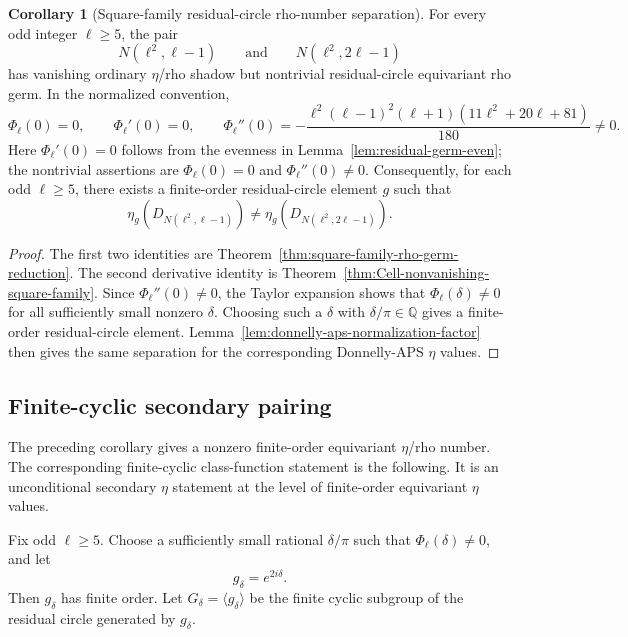 \documentclass{article}
\theoremstyle{definition}
\newtheorem{corollary}[theorem]{Corollary}
\numberwithin{equation}{section}
\begin{document}
\begin{corollary}[Square-family residual-circle rho-number separation]
\label{cor:square-family-rho-separation-final}
For every odd integer $\ell\geq 5$, the pair
\begin{equation}
N(\ell^2,\ell-1)
\qquad\text{and}\qquad
N(\ell^2,2\ell-1)
\end{equation}
has vanishing ordinary $\eta$/rho shadow but nontrivial residual-circle equivariant rho germ.  In the normalized convention,
\begin{equation}
\Phi_\ell(0)=0,
\qquad
\Phi_\ell'(0)=0,
\qquad
\Phi_\ell''(0)=-\frac{\ell^2(\ell-1)^2(\ell+1)(11\ell^2+20\ell+81)}{180}\neq 0.
\end{equation}
Here $\Phi_\ell'(0)=0$ follows from the evenness in Lemma~\ref{lem:residual-germ-even}; the nontrivial assertions are $\Phi_\ell(0)=0$ and $\Phi_\ell''(0)\neq 0$.  Consequently, for each odd $\ell\geq 5$, there exists a finite-order residual-circle element $g$ such that
\begin{equation}
\eta_g(D_{N(\ell^2,\ell-1)})\neq\eta_g(D_{N(\ell^2,2\ell-1)}).
\end{equation}
\end{corollary}

\begin{proof}
The first two identities are Theorem~\ref{thm:square-family-rho-germ-reduction}.  The second derivative identity is Theorem~\ref{thm:Cell-nonvanishing-square-family}.  Since $\Phi_\ell''(0)\neq 0$, the Taylor expansion shows that $\Phi_\ell(\delta)\neq 0$ for all sufficiently small nonzero $\delta$.  Choosing such a $\delta$ with $\delta/\pi\in\mathbb Q$ gives a finite-order residual-circle element. Lemma~\ref{lem:donnelly-aps-normalization-factor} then gives the same separation for the corresponding Donnelly-APS $\eta$ values.
\end{proof}

\subsection{Finite-cyclic secondary pairing}
\label{subsec:stage5B4-finite-cyclic-secondary-pairing}

The preceding corollary gives a nonzero finite-order equivariant $\eta$/rho number.  The corresponding finite-cyclic class-function statement is the following.  It is an unconditional secondary $\eta$ statement at the level of finite-order equivariant $\eta$ values.

Fix odd $\ell\geq 5$.  Choose a sufficiently small rational $\delta/\pi$ such that $\Phi_\ell(\delta)\neq 0$, and let
\begin{equation}
g_\delta=e^{2i\delta}.
\end{equation}
Then $g_\delta$ has finite order.  Let $G_\delta=\langle g_\delta\rangle$ be the finite cyclic subgroup of the residual circle generated by $g_\delta$.
\end{document}
